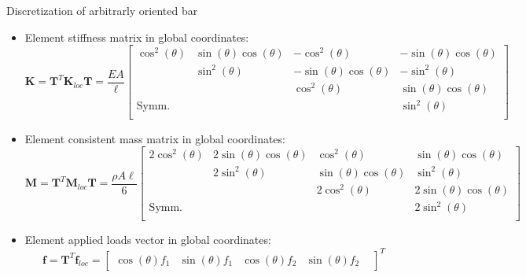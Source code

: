 \documentclass[aspectratio=169]{beamer}
\begin{document}
{  \begin{frame}{Discretization of arbitrarly oriented bar}
    \begin{itemize}
      \item Element stiffness matrix in global coordinates:
            $$\mathbf{K} = \mathbf T^T \mathbf{K}_{loc} \mathbf T   =\frac{EA}{\ell}\begin{bmatrix}
                \cos^2(\theta) & \sin(\theta)\cos(\theta) & -\cos^2(\theta)           & -\sin(\theta)\cos(\theta) \\
                               & \sin^2(\theta)           & -\sin(\theta)\cos(\theta) & -\sin^2(\theta)           \\
                               &                          & \cos^2(\theta)            & \sin(\theta)\cos(\theta)  \\
                \text{Symm.}   &                          &                           & \sin^2(\theta)            \\
              \end{bmatrix}$$
      \item Element consistent mass matrix in global coordinates:
            $$\mathbf{M} = \mathbf T^T \mathbf{M}_{loc} \mathbf T =\frac{\rho A\ell}{6}\begin{bmatrix}
                2\cos^2(\theta) & 2\sin(\theta)\cos(\theta) & \cos^2(\theta)           & \sin(\theta)\cos(\theta)  \\
                                & 2\sin^2(\theta)           & \sin(\theta)\cos(\theta) & \sin^2(\theta)            \\
                                &                           & 2\cos^2(\theta)          & 2\sin(\theta)\cos(\theta) \\
                \text{Symm.}    &                           &                          & 2\sin^2(\theta)           \\
              \end{bmatrix}
            $$
      \item Element applied loads vector in global coordinates:
            \[
              \mathbf{f} = \mathbf T^T \mathbf{f}_{loc} =\begin{bmatrix}
                \cos(\theta)f_1 &
                \sin(\theta)f_1 &
                \cos(\theta)f_2 &
                \sin(\theta)f_2 &
              \end{bmatrix}^T
            \]
    \end{itemize}
  \end{frame}
 }
\end{document}
